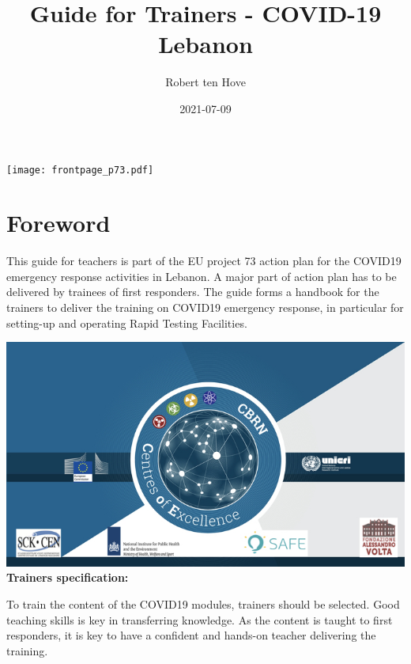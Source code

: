 \documentclass[
]{book}
\title{Guide for Trainers - COVID-19 Lebanon}
\author{Robert ten Hove}
\date{2021-07-09}
\let\oldmaketitle\maketitle
\begin{document}
\maketitle

\thispagestyle{empty}
\begin{center}
\texttt{[image: frontpage\_p73.pdf]}
\end{center}

\let\maketitle\oldmaketitle
\maketitle

{
\setcounter{tocdepth}{1}
\tableofcontents
}
\hypertarget{foreword}{%
\chapter{Foreword}\label{foreword}}

This guide for teachers is part of the EU project 73 action plan for the
COVID19 emergency response activities in Lebanon. A major part of action
plan has to be delivered by trainees of first responders. The guide
forms a handbook for the trainers to deliver the training on COVID19
emergency response, in particular for setting-up and operating Rapid Testing Facilities.

\includegraphics{images/CoE.jpeg}\\
\textbf{Trainers specification:}

To train the content of the COVID19 modules, trainers should be
selected. Good teaching skills is key in transferring knowledge. As the
content is taught to first responders, it is key to have a confident and
hands-on teacher delivering the training.
\end{document}
